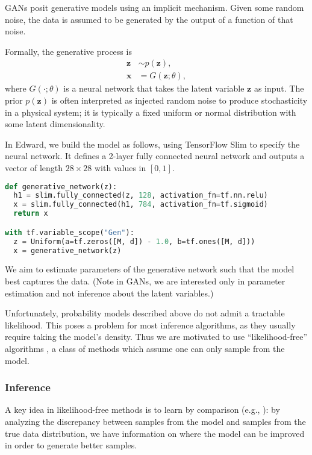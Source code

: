 GANs posit generative models using an implicit mechanism. Given some
random noise, the data is assumed to be generated by the output of a
function of that noise.

Formally, the generative process is
\begin{align*}
\mathbf{z} &\sim p(\mathbf{z}), \\
\mathbf{x} &= G(\mathbf{z}; \theta),
\end{align*}
where $G(\cdot; \theta)$ is a neural network that takes the latent
variable $\mathbf{z}$ as input. The prior $p(\mathbf{z})$ is often
interpreted as injected random noise to produce stochasticity in a
physical system; it is typically a fixed uniform or normal
distribution with some latent dimensionality.

In Edward, we build the model as follows, using TensorFlow Slim to
specify the neural network. It defines a 2-layer fully connected neural
network and outputs a vector of length $28\times28$ with values in
$[0,1]$.

\begin{lstlisting}[language=Python]
def generative_network(z):
  h1 = slim.fully_connected(z, 128, activation_fn=tf.nn.relu)
  x = slim.fully_connected(h1, 784, activation_fn=tf.sigmoid)
  return x

with tf.variable_scope("Gen"):
  z = Uniform(a=tf.zeros([M, d]) - 1.0, b=tf.ones([M, d]))
  x = generative_network(z)
\end{lstlisting}

We aim to estimate parameters of the generative network such
that the model best captures the data. (Note in GANs, we are
interested only in parameter estimation and not inference about the
latent variables.)

Unfortunately, probability models described above do not admit a tractable
likelihood. This poses a problem for most inference algorithms, as
they usually require taking the model's density.  Thus we are
motivated to use ``likelihood-free'' algorithms
\citep{marin2012approximate}, a class of methods which assume one
can only sample from the model.

\subsubsection{Inference}

A key idea in likelihood-free methods is to learn by
comparison (e.g., \citet{rubin1984bayesianly,gretton2012kernel}): by
analyzing the discrepancy between samples from the model and samples
from the true data distribution, we have information on where the
model can be improved in order to generate better samples.

